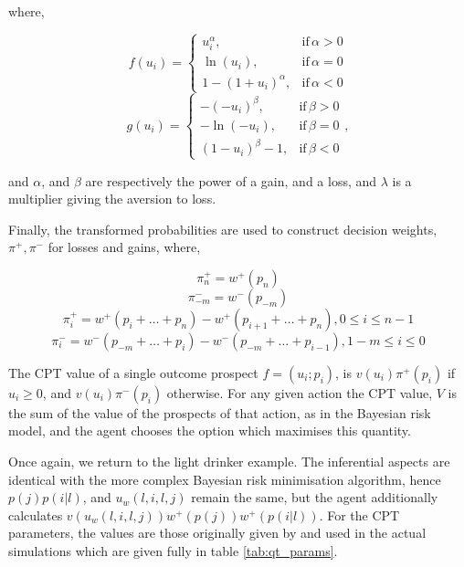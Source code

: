 where,

\begin{equation}
f(u_{i})=\begin{cases}
u_{i}^{\alpha},& \text{if}\,\alpha>0\\
\ln(u_{i}),& \text{if}\,\alpha=0\\
1-(1+u_{i})^{\alpha},& \text{if}\,\alpha<0
\end{cases}
\end{equation}
\begin{equation}
g(u_{i})=\begin{cases}
-(-u_{i})^{\beta},& \text{if}\,\beta>0\\
-\ln(-u_{i}),& \text{if}\,\beta=0\\
(1-u_{i})^{\beta}-1,& \text{if}\,\beta<0
\end{cases},
\end{equation}


and $\alpha$, and $\beta$ are respectively the power of a gain,
and a loss, and \(\lambda\) is a multiplier giving the aversion to loss.

Finally, the transformed probabilities are used to construct decision weights, \(\pi^{+},\pi^{-}\) for losses and gains, where,

\begin{equation}
\pi_{n}^{+}=w^{+}(p_{n})
\end{equation}
\begin{equation}
\pi_{-m}^{-}=w^{-}(p_{-m})
\end{equation}
\begin{equation}
\pi_{i}^{+}=w^{+}(p_{i}+\ldots+p_{n}) - w^{+}(p_{i+1}+\ldots+p_{n}),0\leq i \leq n - 1
\end{equation}
\begin{equation}
\pi_{i}^{-}=w^{-}(p_{-m}+\ldots+p_{i}) - w^{-}(p_{-m}+\ldots+p_{i-1}),1-m\leq i \leq 0
\end{equation}

The \ac{CPT} value of a single outcome prospect \(f=(u_{i};p_{i})\), is $v(u_{i})\pi^{+}(p_{i})$
if $u_{i}\geq0$, and $v(u_{i})\pi^{-}(p_{i})$ otherwise. For any given action the \ac{CPT}
value, \(V\) is the sum of the value of the prospects of that action, as
in the Bayesian risk model, and the agent chooses the option which maximises this quantity.


Once again, we return to the light drinker example.  The inferential aspects are identical with the more complex Bayesian risk minimisation algorithm, hence \(p(j)p(i | l)\), and \(u_{w}(l, i, l, j)\) remain the same, but the agent additionally calculates $v(u_{w}(l, i, l, j))w^{+}(p(j))w^{+}(p(i | l))$. For the \ac{CPT} parameters, the values are those originally given by \citet{Tversky1992} and used in the actual simulations which are given fully in table \ref{tab:qt_params}.

